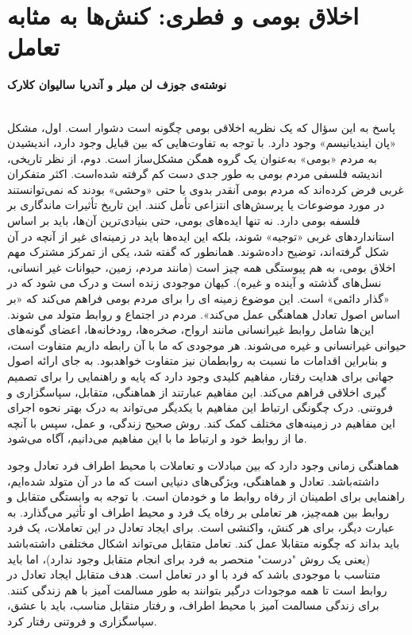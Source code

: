 {
\section*{اخلاق بومی و فطری: کنش‌ها به مثابه تعامل}
\label{sec:اخلاق بومی و فطری: کنش‌ها به مثابه تعامل}
\textbf{نوشته‌ی جوزف لن میلر و آندریا سالیوان کلارک}
\\\\
}
پاسخ به این سؤال که یک نظریه اخلاقی بومی چگونه است دشوار است.
اول، مشکل «پان ایندیانیسم» وجود دارد.
با توجه به تفاوت‌هایی که بین قبایل وجود دارد، اندیشیدن به مردم «بومی» به‌عنوان یک گروه همگن مشکل‌ساز است.
دوم، از نظر تاریخی، اندیشه فلسفی مردم بومی به طور جدی دست کم گرفته شده‌است.
اکثر متفکران غربی فرض کرده‌اند که مردم بومی آنقدر بدوی یا حتی «وحشی» بودند که نمی‌توانستند در مورد موضوعات یا پرسش‌های انتزاعی تأمل کنند.
این تاریخ تأثیرات ماندگاری بر فلسفه بومی دارد.
نه تنها ایده‌های بومی، حتی بنیادی‌ترین آن‌ها، باید بر اساس استانداردهای غربی «توجیه» شوند، بلکه این ایده‌ها باید در زمینه‌ای غیر از آنچه در آن شکل گرفته‌اند، توضیح داده‌شوند.
همانطور که گفته شد، یکی از تمرکز مشترک مهم اخلاق بومی، به هم پیوستگی همه چیز است (مانند مردم، زمین، حیوانات غیر انسانی، نسل‌های گذشته و آینده و غیره).
کیهان موجودی زنده است و درک می شود که در «گذار دائمی» است.
این موضوع زمینه ای را برای مردم بومی فراهم می‌کند که «بر اساس اصول تعادل هماهنگی عمل می‌کند».
مردم در اجتماع و روابط متولد می شوند.
این‌ها شامل روابط غیرانسانی مانند ارواح، صخره‌ها، رودخانه‌ها، اعضای گونه‌های حیوانی غیرانسانی و غیره می‌شوند.
هر موجودی که ما با آن رابطه داریم متفاوت است، و بنابراین اقدامات ما نسبت به روابطمان نیز متفاوت خواهدبود.
به جای ارائه اصول جهانی برای هدایت رفتار، مفاهیم کلیدی وجود دارد که پایه و راهنمایی را برای تصمیم گیری اخلاقی فراهم می‌کند.
این مفاهیم عبارتند از هماهنگی، متقابل، سپاسگزاری و فروتنی.
درک چگونگی ارتباط این مفاهیم با یکدیگر می‌تواند به درک بهتر نحوه اجرای این مفاهیم در زمینه‌های مختلف کمک کند.
روش صحیح زندگی، و عمل، سپس با آنچه ما از روابط خود و ارتباط ما با این مفاهیم می‌دانیم، آگاه می‌شود.

هماهنگی زمانی وجود دارد که بین مبادلات و تعاملات با محیط اطراف فرد تعادل وجود داشته‌باشد.
تعادل و هماهنگی، ویژگی‌های دنیایی است که ما در آن متولد شده‌ایم، راهنمایی برای اطمینان از رفاه روابط ما و خودمان است.
با توجه به وابستگی متقابل و روابط بین همه‌چیز، هر تعاملی بر رفاه یک فرد و محیط اطراف او تأثیر می‌گذارد.
به عبارت دیگر، برای هر کنش، واکنشی است.
برای ایجاد تعادل در این تعاملات، یک فرد باید بداند که چگونه متقابلا عمل کند.
تعامل متقابل می‌تواند اشکال مختلفی داشته‌باشد (یعنی یک روش "درست" منحصر به فرد برای انجام متقابل وجود ندارد)، اما باید متناسب با موجودی باشد که فرد با او در تعامل است.
هدف متقابل ایجاد تعادل در روابط است تا همه موجودات درگیر بتوانند به طور مسالمت آمیز با هم زندگی کنند.
برای زندگی مسالمت آمیز با محیط اطراف، و رفتار متقابل مناسب، باید با عشق، سپاسگزاری و فروتنی رفتار کرد.


